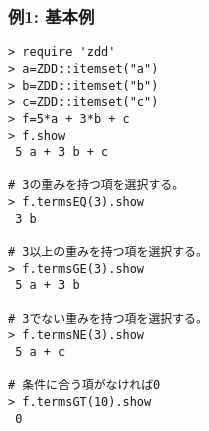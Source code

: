 \subsubsection*{例1: 基本例}



\begin{Verbatim}[baselinestretch=0.7,frame=single]
> require 'zdd'
> a=ZDD::itemset("a")
> b=ZDD::itemset("b")
> c=ZDD::itemset("c")
> f=5*a + 3*b + c
> f.show
 5 a + 3 b + c

# 3の重みを持つ項を選択する。
> f.termsEQ(3).show
 3 b

# 3以上の重みを持つ項を選択する。
> f.termsGE(3).show
 5 a + 3 b

# 3でない重みを持つ項を選択する。
> f.termsNE(3).show
 5 a + c

# 条件に合う項がなければ0
> f.termsGT(10).show
 0
\end{Verbatim}
